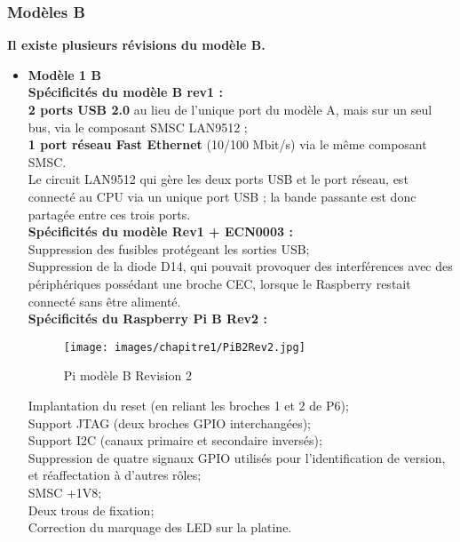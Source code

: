 \documentclass[12pt,a4paper,oneside]{book}
\begin{document}
	\subsubsection{Modèles B}
	\textbf{Il existe plusieurs révisions du modèle B.}\\
	\begin{itemize}
		\item \textbf{Modèle 1 B}\\
		\textbf{Spécificités du modèle B rev1 :}\\
		\textbf{2 ports USB 2.0} au lieu de l'unique port du modèle A, mais sur un seul bus, via le composant SMSC LAN9512 ;\\
		\textbf{ 1 port réseau Fast Ethernet} (10/100 Mbit/s) via le même composant SMSC.\\
		Le circuit LAN9512 qui gère les deux ports USB et le port réseau, est connecté au CPU via un unique port USB ; la bande passante est donc partagée entre ces trois ports.\\
		
		\textbf{Spécificités du modèle Rev1 + ECN0003 :}\\
		Suppression des fusibles protégeant les sorties USB;\\
		Suppression de la diode D14, qui pouvait provoquer des interférences avec des périphériques possédant une broche CEC, lorsque le Raspberry restait connecté sans être alimenté.\\
		
		\textbf{Spécificités du Raspberry Pi B Rev2 :}\\
		\begin{figure}[H]
		\begin{center}
			\texttt{[image: images/chapitre1/PiB2Rev2.jpg]}
			\caption{Pi modèle B Revision 2}
			\label{Types}
		\end{center}
		\end{figure}

		Implantation du reset (en reliant les broches 1 et 2 de P6);\\
		Support JTAG (deux broches GPIO interchangées);\\
		Support I2C (canaux primaire et secondaire inversés);\\
		Suppression de quatre signaux GPIO utilisés pour l'identification de version, et réaffectation à d'autres rôles;\\
		SMSC +1V8;\\
		Deux trous de fixation;\\
		Correction du marquage des LED sur la platine.\\
		

\end{itemize}
\end{document}

